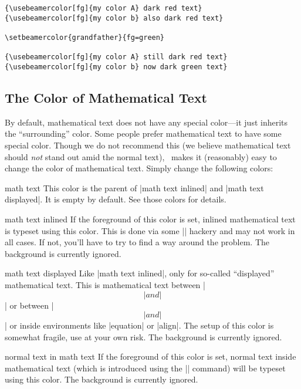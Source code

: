 \begin{command}{\setbeamercolor\opt{|*|}}
\begin{itemize}
\begin{verbatim}
{\usebeamercolor[fg]{my color A} dark red text}
{\usebeamercolor[fg]{my color b} also dark red text}

\setbeamercolor{grandfather}{fg=green}

{\usebeamercolor[fg]{my color A} still dark red text}
{\usebeamercolor[fg]{my color b} now dark green text}
\end{verbatim}
  \end{itemize}
\end{command}


\subsection{The Color of Mathematical Text}

By default, mathematical text does not have any special color---it just inherits the ``surrounding'' color. Some people prefer mathematical text to have some special color. Though we do not recommend this (we believe mathematical text should \emph{not} stand out amid the normal text), \beamer\ makes it (reasonably) easy to change the color of mathematical text. Simply change the following colors:

\begin{element}{math text}\no\yes\no
  This color is the parent of |math text inlined| and |math text displayed|. It is empty by default. See those colors for details.
\end{element}

\begin{element}{math text inlined}\no\yes\no
  If the foreground of this color is set, inlined mathematical text is typeset using this color. This is done via some |\everymath| hackery and may not work in all cases. If not, you'll have to try to find a way around the problem. The background is currently ignored.
\end{element}

\begin{element}{math text displayed}\no\yes\no
  Like |math text inlined|, only for so-called ``displayed'' mathematical text. This is mathematical text between |\[| and |\]| or between |$$| and |$$| or inside environments like |equation| or |align|. The setup of this color is somewhat fragile, use at your own risk. The background is currently ignored.
\end{element}

\begin{element}{normal text in math text}\no\yes\no
  If the foreground of this color is set, normal text inside mathematical text (which is introduced using the |\text| command) will be typeset using this color. The background is currently ignored.
\end{element}


